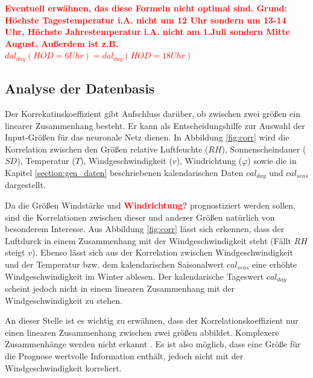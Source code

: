 \documentclass[
12pt, %
toc=listofnumbered, %
toc=chapterentrydotfill, %
numbers=noenddot, %
captions=tableheading, %
bibliography=numbered
]{scrreprt}
\let\Oldsubsection\subsection
\renewcommand{\subsection}{\FloatBarrier\Oldsubsection}
\newcommand{\highlight}[1]{\textbf{\textcolor{red}{#1}}}
\begin{document}
\highlight{Eventuell erwähnen, das diese Formeln nicht optimal sind. Grund: Höchste Tagestemperatur i.A. nicht um 12 Uhr sondern um 13-14 Uhr, Höchste Jahrestemperatur i.A. nicht am 1.Juli sondern Mitte August. Außerdem ist z.B. $dal_{day}(HOD=6Uhr) = dal_{day}(HOD=18Uhr)$}

\subsection{Analyse der Datenbasis}
Der Korrekatinskoeffizient gibt Aufschluss darüber, ob zwischen zwei größen ein linearer Zusammenhang besteht. Er kann als Entscheidungshilfe zur Auswahl der Input-Größen für das neuronale Netz dienen. In Abbildung \ref{fig:corr} wird die Korrelation zwischen den Größen relative Luftfeuchte ($RH$), Sonnenscheindauer ($SD$), Temperatur ($T$), Windgeschwindigkeit ($v$), Windrichtung ($\varphi$) sowie die in Kapitel \ref{section:gen_daten} beschriebenen kalendarischen Daten $cal_{day}$ und $cal_{seas}$ dargestellt. 



Da die Größen Windstärke und \highlight{Windrichtung?} prognostiziert werden sollen, sind die Korrelationen zwischen dieser und anderer Größen natürlich von besonderem Interesse. Aus Abbildung \ref{fig:corr} lässt sich erkennen, dass der Luftdurck in einem Zusammenhang mit der Windgeschwindigkeit steht (Fällt $RH$ steigt $v$). Ebenso lässt sich aus der Korrelation zwischen Windgeschwindigkeit und der Temperatur bzw. dem kalendarischen Saisonalwert $cal_{seas}$ eine erhöhte Windgeschwindigkeit im Winter ablesen. Der kalendarische Tageswert $cal_{day}$ scheint jedoch nicht in einem linearen Zusammenhang mit der Windgeschwindigkeit zu stehen.

\bigskip
An dieser Stelle ist es wichtig zu erwähnen, dass der Korrelationskoeffizient nur einen linearen Zusammenhang zwischen zwei größen abbildet. Komplexere Zusammenhänge werden nicht erkannt \cite{2020_Ranjan_EstimatingNonlinearCorrelation}. Es ist also möglich, dass eine Größe für die Prognose wertvolle Information enthält, jedoch nicht mit der Windgeschwindigkeit korreliert.
\end{document}

